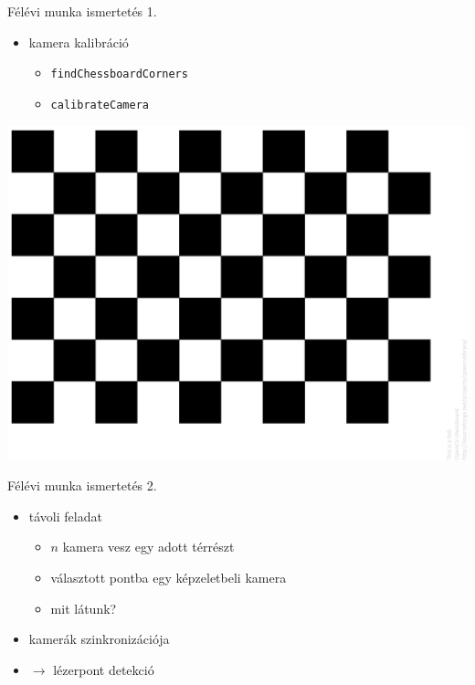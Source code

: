 \documentclass[17pt,xcolor=x11names]{beamer}
\begin{document}
\begin{frame}{Félévi munka ismertetés 1.}
\begin{itemize}
\item kamera kalibráció
\begin{itemize}
\item \texttt{findChessboardCorners}
\item \texttt{calibrateCamera}
\end{itemize}
\end{itemize}

\begin{center}
\includegraphics[scale=0.10]{figs/pattern.png}
\end{center}

\end{frame}

\begin{frame}{Félévi munka ismertetés 2.}
\begin{itemize}
\item távoli feladat
\begin{itemize}
\item $n$ kamera vesz egy adott térrészt
\item választott pontba egy képzeletbeli kamera
\item mit látunk?
\end{itemize}
\item kamerák szinkronizációja
\item $\rightarrow$ lézerpont detekció
\end{itemize}
\end{frame}
\end{document}
